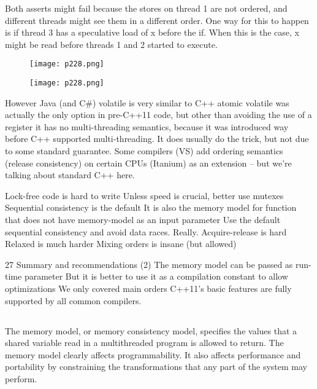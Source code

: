 Both asserts might fail because the stores on thread 1 are not ordered,
 and different threads might see them in a different order. 
 One way for this to happen is if thread 3 has a speculative load of x before 
 the if. When this is the case, x might be read before threads 1 and 2 
 started to execute.


 \begin{figure}[H]
    \centering
    \texttt{[image: p228.png]}
    \caption{}
    \label{fig:p229}
\end{figure}

\begin{figure}[H]
    \centering
    \texttt{[image: p228.png]}
    \caption{}
    \label{fig:p229}
\end{figure}


However Java (and C\#) volatile is very similar to C++ atomic
volatile was actually the only option in pre-C++11 code, but other than avoiding the use of a register it has no multi-threading semantics, because it was introduced way before C++ supported multi-threading. It does usually do the trick, but not due to some standard guarantee.
Some compilers (VS) add ordering semantics (release consistency) on certain CPUs (Itanium) as an extension – but we’re talking about standard C++ here.


Lock-free code is hard to write
Unless speed is crucial, better use mutexes
Sequential consistency is the default
It is also the memory model for function that does not have memory-model as an input parameter
Use the default sequential consistency and avoid data races. Really.
Acquire-release is hard
Relaxed is much harder
Mixing orders is insane (but allowed)

27 Summary and recommendations (2)
The memory model can be passed as run-time parameter
But it is better to use it as a compilation constant to allow optimizations
We only covered main orders
C++11’s basic features are fully supported by all common compilers.



\subsection{}


The memory model, or memory consistency model, specifies the
values that a shared variable read in a multithreaded program is allowed to return. 
The memory model clearly affects programmability. 
It also affects performance and portability by constraining the
transformations that any part of the system may perform. 






